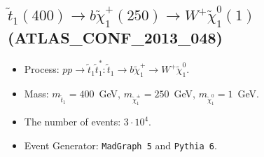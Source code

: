     
\subsection{$\tilde t_1(400) \to b \tilde \chi_1^+(250) \to W^+ \tilde \chi_1^0(1)$ (ATLAS\_CONF\_2013\_048)} 


        \begin{itemize}
        \item  Process: $pp \to \tilde t_1 \tilde t_1^*: \tilde t_1 \to b \tilde \chi_1^+ \to W^+ \tilde \chi_1^0$.
        \item  Mass: $m_{\tilde t_1} = 400$~GeV, $m_{\tilde \chi_1^\pm} = 250$~GeV, $m_{\tilde \chi_1^0} = 1$~GeV.
        \item  The number of events: $3 \cdot 10^4$.
        \item  Event Generator: {\tt MadGraph 5} and {\tt Pythia 6}.    
        \end{itemize}    
    
